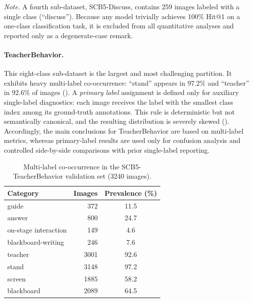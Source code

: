 \documentclass[symmetry,article,submit,pdftex,moreauthors]{Definitions/mdpi}
\begin{document}
\noindent\textit{Note.} A fourth sub-dataset, SCB5-Discuss, contains 259 images labeled with a single class (``discuss''). Because any model trivially achieves 100\% Hit@1 on a one-class classification task, it is excluded from all quantitative analyses and reported only as a degenerate-case remark.

\paragraph{TeacherBehavior.}
This eight-class sub-dataset is the largest and most challenging partition.
It exhibits heavy multi-label co-occurrence: ``stand'' appears in 97.2\% and ``teacher'' in 92.6\% of images ().
A \emph{primary label} assignment is defined only for auxiliary single-label diagnostics: each image receives the label with the smallest class index among its ground-truth annotations.
This rule is deterministic but not semantically canonical, and the resulting distribution is severely skewed (). Accordingly, the main conclusions for TeacherBehavior are based on multi-label metrics, whereas primary-label results are used only for confusion analysis and controlled side-by-side comparisons with prior single-label reporting.

\begin{table}[H]
\caption{Multi-label co-occurrence in the SCB5-TeacherBehavior validation set (3240 images).}
\label{tab:dataset_multi}
\centering
\begin{tabular}{lrc}
\toprule
\textbf{Category} & \textbf{Images} & \textbf{Prevalence (\%)} \\
\midrule
guide & 372 & 11.5 \\
answer & 800 & 24.7 \\
on-stage interaction & 149 & 4.6 \\
blackboard-writing & 246 & 7.6 \\
teacher & 3001 & 92.6 \\
stand & 3148 & 97.2 \\
screen & 1885 & 58.2 \\
blackboard & 2089 & 64.5 \\
\bottomrule
\end{tabular}
\end{table}
\end{document}
